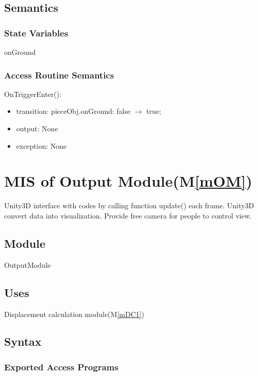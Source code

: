 \documentclass[12pt, titlepage]{article}
\newcommand{\mref}[1]{M\ref{#1}}
\begin{document}
\subsection{Semantics}

\subsubsection{State Variables}

onGround

\subsubsection{Access Routine Semantics}

\noindent OnTriggerEnter():
\begin{itemize}
	\item transition: pieceObj.onGround: false $\to$ true;
	\item output: None 
	\item exception: None 
\end{itemize}

\section{MIS of Output Module(\mref{mOM})}

Unity3D interface with codes by calling function update() each frame. Unity3D convert data into visualization. Provide free camera for people to control view.

\subsection{Module}

OutputModule

\subsection{Uses}

Displacement calculation module(\mref{mDC1})

\subsection{Syntax}

\subsubsection{Exported Access Programs}
\end{document}
